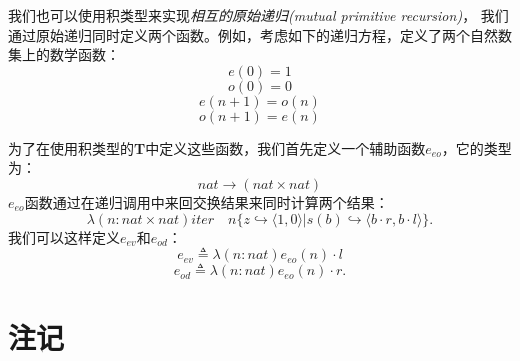 我们也可以使用积类型来实现\textit{相互的原始递归(mutual primitive recursion)}，
我们通过原始递归同时定义两个函数。例如，考虑如下的递归方程，定义了两个自然数集上的数学函数：
\begin{equation*}
    e(0) = 1
\end{equation*}
\begin{equation*}
    o(0) = 0 
\end{equation*}
\begin{equation*}
    e(n+1) = o(n) 
\end{equation*}
\begin{equation*}
    o(n+1) = e(n)
\end{equation*}


为了在使用积类型的\textbf{T}中定义这些函数，我们首先定义一个辅助函数$e_{eo}$，它的类型为：
$$nat \rightarrow (nat \times nat)$$
$e_{eo}$函数通过在递归调用中来回交换结果来同时计算两个结果：
$$
\lambda (n:nat\times nat) iter \quad n \{ z \hookrightarrow \langle 1,0 \rangle |
s(b) \hookrightarrow \langle b \cdot r, b \cdot l \rangle \}.
$$
我们可以这样定义$e_{ev}$和$e_{od}$：
\begin{equation*}
    e_{ev} \triangleq \lambda(n:nat)e_{eo}(n) \cdot l
\end{equation*}
\begin{equation*}
    e_{od} \triangleq \lambda(n:nat)e_{eo}(n) \cdot r.
\end{equation*}


\section{注记}


